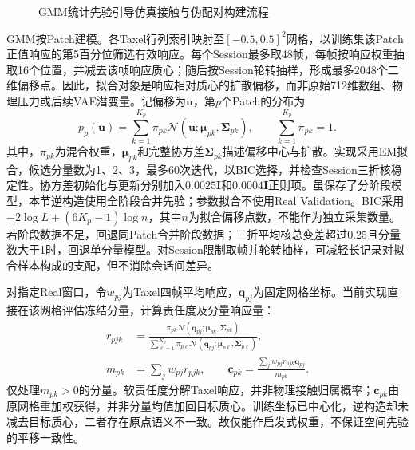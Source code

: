 \begin{figure}[htbp]
 \centering
 \caption{GMM统计先验引导仿真接触与伪配对构建流程}
 \label{fig:ch05_gmm_physical_pipeline}
\end{figure}

GMM按Patch建模。各Taxel行列索引映射至$[-0.5,0.5]^2$网格，以训练集该Patch正值响应的第5百分位筛选有效响应。每个Session最多取48帧，每帧按响应权重抽取16个位置，并减去该帧响应质心；随后按Session轮转抽样，形成最多2048个二维偏移点。因此，拟合对象是响应相对质心的扩散偏移，而非原始712维数组、物理压力或后续VAE潜变量。记偏移为$\boldsymbol u$，第$p$个Patch的分布为
\begin{equation}
 p_p(\boldsymbol u)=\sum_{k=1}^{K_p}\pi_{pk}
 \mathcal N(\boldsymbol u;\boldsymbol\mu_{pk},\boldsymbol\Sigma_{pk}),
 \qquad \sum_{k=1}^{K_p}\pi_{pk}=1.
 \label{eq:ch05_gmm_prior}
\end{equation}
其中，$\pi_{pk}$为混合权重，$\boldsymbol\mu_{pk}$和完整协方差$\boldsymbol\Sigma_{pk}$描述偏移中心与扩散。实现采用EM拟合，候选分量数为1、2、3，最多60次迭代，以BIC选择，并检查Session三折核稳定性。协方差初始化与更新分别加入$0.0025\boldsymbol I$和$0.0004\boldsymbol I$正则项。虽保存了分阶段模型，本节逆构造使用全阶段合并先验；参数拟合不使用Real Validation。BIC采用$-2\log L+(6K_p-1)\log n$，其中$n$为拟合偏移点数，不能作为独立采集数量。若阶段数据不足，回退同Patch合并阶段数据；三折平均核总变差超过0.25且\mbox{分量数}大于1时，回退单分量模型。对Session限制取帧并轮转抽样，可减轻长记录对拟合样本构成的支配，但不消除会话间差异。

对指定Real窗口，令$w_{pj}$为Taxel四帧平均响应，$\boldsymbol q_{pj}$为固定网格坐标。当前实现直接在该网格评估冻结分量，计算责任度及分量响应量：
\begin{equation}
 \begin{aligned}
 r_{pjk}&=\frac{\pi_{pk}\mathcal N(\boldsymbol q_{pj};\boldsymbol\mu_{pk},\boldsymbol\Sigma_{pk})}
 {\sum_{\ell=1}^{K_p}\pi_{p\ell}\mathcal N(\boldsymbol q_{pj};\boldsymbol\mu_{p\ell},\boldsymbol\Sigma_{p\ell})},\\
 m_{pk}&=\sum_j w_{pj}r_{pjk},\qquad
 \boldsymbol c_{pk}=\frac{\sum_j w_{pj}r_{pjk}\boldsymbol q_{pj}}{m_{pk}}.
 \end{aligned}
 \label{eq:ch05_gmm_responsibility}
\end{equation}
仅处理$m_{pk}>0$的分量。软责任度分解Taxel响应，并非物理接触归属概率；$\boldsymbol c_{pk}$由原网格重加权获得，并非分量均值加回目标质心。训练坐标已中心化，逆构造却未减去目标质心，二者存在原点语义不一致。故仅能作启发式权重，不保证空间先验的平移一致性。


